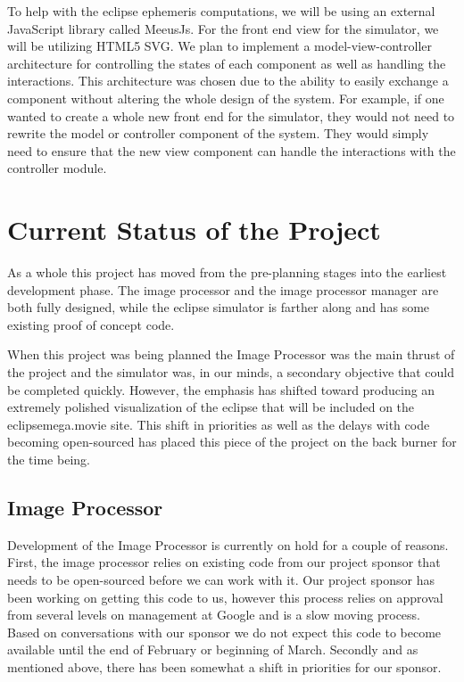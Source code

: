 \documentclass[10pt, onecolumn, draftclsnofoot, letterpaper, compsoc]{IEEEtran}
\begin{document}
To help with the eclipse ephemeris computations, we will be using an external
JavaScript library called MeeusJs. For the front end view for the simulator,
we will be utilizing HTML5 SVG. We plan to implement a model-view-controller
architecture for controlling the states of each component as well as handling
the interactions. This architecture was chosen due to the ability to easily
exchange a component without altering the whole design of the system. For
example, if one wanted to create a whole new front end for the simulator,
they would not need to rewrite the model or controller component of the system.
They would simply need to ensure that the new view component can handle the
interactions with the controller module.


\section{Current Status of the Project}

As a whole this project has moved from the pre-planning stages into the earliest
development phase. The image processor and the image processor manager are both
fully designed, while the eclipse simulator is farther along and has some existing proof of
concept code.

When this project was being planned
the Image Processor was the main thrust of the project and the simulator was, in
our minds, a secondary objective that could be completed quickly. However, the
emphasis has shifted toward producing an extremely polished visualization of the
eclipse that will be included on the eclipsemega.movie site. This shift in
priorities as well as the delays with code becoming open-sourced has placed this
piece of the project on the back burner for the time being.

\subsection{Image Processor}

Development of the Image Processor is currently on hold for a couple of reasons.
First, the image processor relies on existing code from our project sponsor that
needs to be open-sourced before we can work with it. Our project sponsor has
been working on getting this code to us, however this process relies on approval
from several levels on management at Google and is a slow moving process. Based
on conversations with our sponsor we do not expect this code to become available
until the end of February or beginning of March. Secondly and as mentioned above,
there has been somewhat a shift in priorities for our sponsor.
\end{document}
